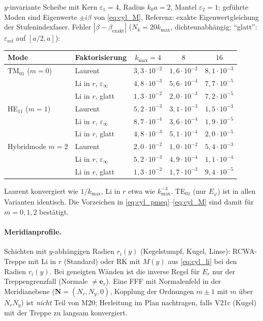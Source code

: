 \begin{tcolorbox}[title={Befund Prototyp (Python, \texttt{scripts/proto\_cylindrical.py}): Fasermoden als Eigenwerte von $M$}]
$y$-invariante Scheibe mit Kern $\varepsilon_1=4$, Radius $k_0a=2$, Mantel $\varepsilon_2=1$; geführte Moden sind
Eigenwerte $\pm i\beta$ von \eqref{eq:cyl_M}, Referenz: exakte Eigenwertgleichung der Stufenindexfaser. Fehler
$|\beta-\beta_{\text{exakt}}|$ ($N_k=20k_{\max}$, dichteunabhängig; \enquote{glatt}: $\varepsilon_{\text{ref}}$ auf $[a/2,a]$):
\begin{center}
\begin{tabular}{llccc}
\toprule
Mode & Faktorisierung & $k_{\max}=4$ & $8$ & $16$ \\
\midrule
TM$_{01}$ ($m=0$) & Laurent & $3{,}3\cdot10^{-2}$ & $1{,}6\cdot10^{-2}$ & $8{,}1\cdot10^{-3}$ \\
 & Li in $r$, $\varepsilon_\infty$ & $4{,}8\cdot10^{-3}$ & $5{,}6\cdot10^{-4}$ & $7{,}7\cdot10^{-5}$ \\
 & Li in $r$, glatt & $1{,}3\cdot10^{-2}$ & $2{,}0\cdot10^{-3}$ & $7{,}2\cdot10^{-5}$ \\
\midrule
HE$_{11}$ ($m=1$) & Laurent & $5{,}2\cdot10^{-3}$ & $3{,}1\cdot10^{-3}$ & $1{,}5\cdot10^{-3}$ \\
 & Li in $r$, $\varepsilon_\infty$ & $8{,}7\cdot10^{-4}$ & $3{,}6\cdot10^{-4}$ & $1{,}9\cdot10^{-5}$ \\
 & Li in $r$, glatt & $4{,}8\cdot10^{-3}$ & $5{,}1\cdot10^{-4}$ & $2{,}0\cdot10^{-5}$ \\
\midrule
Hybridmode $m=2$ & Laurent & $2{,}0\cdot10^{-2}$ & $1{,}0\cdot10^{-2}$ & $5{,}4\cdot10^{-3}$ \\
 & Li in $r$, $\varepsilon_\infty$ & $5{,}2\cdot10^{-3}$ & $4{,}9\cdot10^{-4}$ & $1{,}1\cdot10^{-4}$ \\
 & Li in $r$, glatt & $1{,}3\cdot10^{-2}$ & $1{,}7\cdot10^{-3}$ & $9{,}4\cdot10^{-5}$ \\
\bottomrule
\end{tabular}
\end{center}
Laurent konvergiert wie $1/k_{\max}$, Li in $r$ etwa wie $k_{\max}^{-3}$. TE$_{01}$ (nur $E_\varphi$) ist in allen Varianten
identisch. Die Vorzeichen in \eqref{eq:cyl_pmeq}--\eqref{eq:cyl_M} sind damit für $m=0,1,2$ bestätigt.
\end{tcolorbox}

\paragraph{Meridianprofile.} Schichten mit $y$-abhängigen Radien $r_i(y)$ (Kegelstumpf, Kugel, Linse): RCWA-Treppe mit
Li in $r$ (Standard) oder RK mit $M(y)$ aus \eqref{eq:cyl_li} bei den Radien $r_i(y)$. Bei geneigten Wänden ist die
inverse Regel für $E_r$ nur der Treppengrenzfall (Normale $\ne\mathbf e_r$). Eine FFF mit Normalenfeld in der
Meridianebene ($\mathbf N=(N_r,N_y,0)$, Kopplung der Ordnungen $m\pm1$ mit $m$ über $N_rN_y$) ist \emph{nicht} Teil von
M20; Herleitung im Plan nachtragen, falls V21c (Kugel) mit der Treppe zu langsam konvergiert.

